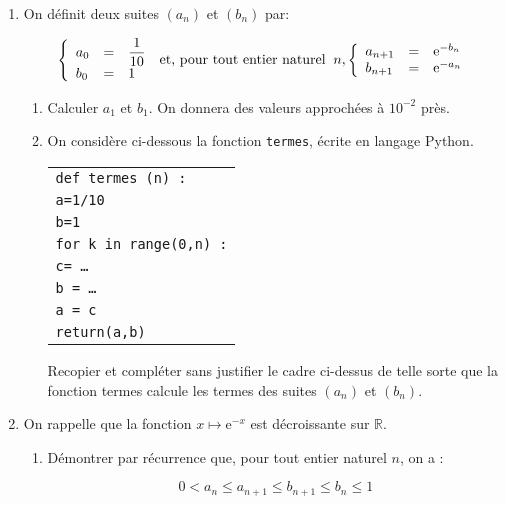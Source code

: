 \documentclass[11pt,a4paper,french]{article}
\newcommand{\R}{\mathbb{R}}
\begin{document}
\begin{enumerate}
\item On définit deux suites $\left(a_n\right)$ et $\left(b_n\right)$ par:

\[\left\{\begin{array}{l c l}
a_0& =& \dfrac{1}{10}\\
b_0& =& 1
\end{array}\right.\: \text{et, pour tout entier naturel }\: n,\left\{\begin{array}{l c l}
a_{n+1}&=&\text{e}^{-b_n}\\
b_{n+1}&=&\text{e}^{-a_n}
\end{array}\right.\]

	\begin{enumerate}
		\item Calculer $a_1$ et $b_1$. On donnera des valeurs approchées à $10^{-2}$ près.
		\item On considère ci-dessous la fonction \texttt{termes}, écrite en langage Python.
		
\begin{center}

\begin{tabular}{|l|}\hline
\texttt{def termes (n) :}\\
\quad \texttt{a=1/10}\\
\quad \texttt{b=1}\\
\quad \texttt{for k in range(0,n) :}\\
\qquad \texttt{c= \ldots}\\
\qquad \texttt{b  = \ldots}\\
\qquad \texttt{a = c}\\
\quad \texttt{return(a,b)}\\ \hline
\end{tabular}
\end{center}

Recopier et compléter sans justifier le cadre ci-dessus de telle sorte que la fonction termes calcule les termes des suites $\left(a_n\right)$ et $\left(b_n\right)$.
	\end{enumerate}
\item On rappelle que la fonction $x \longmapsto \text{e}^{-x}$ est décroissante sur $\R$.
	\begin{enumerate}
		\item Démontrer par récurrence que, pour tout entier naturel $n$, on a :
		
		\[0 < a_n \leqslant a_{n+1} \leqslant b_{n+1} \leqslant b_n \leqslant 1\]
		

\end{enumerate}
\end{enumerate}
\end{document}

